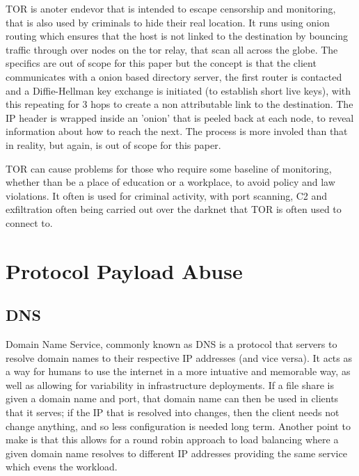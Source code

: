 TOR is anoter endevor that is intended to escape censorship and monitoring, that is also used by criminals to hide their real location. It runs using onion routing which ensures that the host is not linked to the destination by
bouncing traffic through over nodes on the tor relay, that scan all across the globe. The specifics are out of scope for this paper but the concept is that the client communicates with a onion based directory server, the first router is
contacted and a Diffie-Hellman key exchange is initiated (to establish short live keys), with this repeating for 3 hops to create a non attributable link to the destination. The IP header is wrapped inside an 'onion' that is peeled back at each node, to reveal information about how to reach the next.
The process is more involed than that in reality, but again, is out of scope for this paper. \citep{TorMalware}

TOR can cause problems for those who require some baseline of monitoring, whether than be a place of education or a workplace, to avoid policy and law violations. It often is used for criminal activity, with port scanning, 
C2 and exfiltration often being carried out over the darknet that TOR is often used to connect to. \citep{TorMalware}


\section{Protocol Payload Abuse}

\subsection{DNS}
Domain Name Service, commonly known as DNS is a protocol that servers to resolve domain names to their respective IP addresses (and vice versa). It acts as a way for humans to use the internet in a more intuative and
memorable way, as well as allowing for variability in infrastructure deployments. If a file share is given a domain name and port, that domain name can then be used in clients that it serves; if the IP that is resolved into changes,
then the client needs not change anything, and so less configuration is needed long term. Another point to make is that this allows for a round robin approach to load balancing where a given domain name resolves to different IP addresses providing the
same service which evens the workload. 

